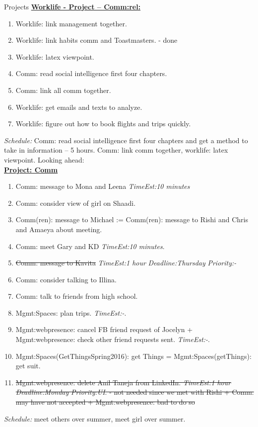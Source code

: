 \documentclass[serif, mathserif, final]{beamer}
\newcommand{\doneTask}[1]{\tiny \item \tiny \sout{#1}}
\newcommand{\te}[1]{\textit{TimeEst:}\textit{#1}}
\newcommand{\dl}[1]{\textit{Deadline:}\textit{#1}}
\newcommand{\pr}[1]{\textit{Priority:}\textit{#1}}
\begin{document}
\begin{frame}
\begin{columns}
\begin{column}{0.5\textwidth}
\begin{block}{Projects}
{\underline{\textbf{Worklife - Project – Comm:rel:}}}
\begin{enumerate} 
  \tiny \item \tiny Worklife: link management together.  
\item \tiny Worklife: link habits comm and Toastmasters. - done
\item \tiny Worklife: latex viewpoint. 
\item \tiny Comm: read social intelligence first four chapters.
\item \tiny Comm: link all comm together.
\item \tiny Worklife: get emails and texts to analyze. 
\item \tiny Worklife: figure out how to book flights and trips quickly. 
\end{enumerate}
\textit{Schedule:} Comm: read social intelligence first four chapters
and get a method to take in information – 5 hours. Comm: link comm together, worklife: latex viewpoint. Looking ahead:  \\
{\underline{\textbf{ Project: Comm}}}
\begin{enumerate}
  \tiny \item \tiny Comm: message to Mona and Leena \te{10 minutes} 
\item \tiny Comm: consider view of girl on Shaadi. 
\item \tiny Comm(ren): message to Michael :=  Comm(ren): message to Rishi and Chris and Amaeya about meeting. 
\item \tiny Comm: meet Gary and KD \te{10 minutes}. 
  \doneTask{Comm: message to Kavita} 
\te{1 hour} \dl{Thursday} \pr{-}
      \item \tiny Comm: consider talking to Illina.
      \item \tiny Comm: talk to friends from high school.
      \item \tiny Mgmt:Spaces: plan trips. \te{-}.
      \item \tiny Mgmt:webpresence: cancel FB friend request of
        Jocelyn + Mgmt:webpresence: check other friend requests
        sent. \te{-}.
      \item \tiny Mgmt:Spaces(GetThingsSpring2016): get Things =
        Mgmt:Spaces(getThings): get suit. 
      \doneTask{Mgmt:webpresence: delete Anil Taneja from
        LinkedIn. \te{1 hour} \dl{Monday} \pr{UI}. - not needed since
        we met with Rishi  + Comm: may have not accepted +
        Mgmt:webpresence: bad to do so}
\end{enumerate}
{\it Schedule:} meet others over summer, meet girl over summer.\\


\end{block}
\end{column}
\end{columns}
\end{frame}
\end{document}
